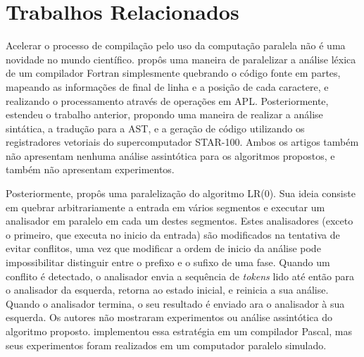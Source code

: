 
\newcommand{\sla}{\textbackslash}

\newcommand{\cmd}[1]{\textsf{#1}}

\newcommand{\pkg}[1]{\textsf{#1}}

\newcommand{\ltxcmd}[1]{\cmd{\sla{}#1}}

\chapter{Trabalhos Relacionados}
\label{chap:related_works}

Acelerar o processo de compilação pelo uso da computação paralela não é
uma novidade no mundo científico. \cite{Lincoln:1970:PPT:987475.987478}
propôs uma maneira de paralelizar a análise léxica de um compilador
Fortran simplesmente quebrando o código fonte em partes, mapeando as 
informações de final de
linha e a posição de cada caractere, e realizando o processamento
através de operações em APL.
Posteriormente, \cite{Krohn:1975:PAC:390015.808414} estendeu o trabalho
anterior, propondo uma maneira de realizar a análise sintática, a 
tradução para a AST, e a geração
de código utilizando os registradores vetoriais do supercomputador
STAR-100. Ambos os artigos também não apresentam nenhuma
análise assintótica para os algoritmos propostos, e também não apresentam
experimentos. 

Posteriormente, \cite{Mickunas:1978:PCM:800127.804105} propôs uma
paralelização do algoritmo LR($0$). Sua ideia consiste em quebrar
arbitrariamente a entrada em vários segmentos e executar um analisador em paralelo
em cada um destes segmentos. Estes analisadores (exceto o primeiro,
que executa no inicio da entrada) são modificados na tentativa de
evitar conflitos, uma vez que modificar a ordem de inicio da análise
pode impossibilitar distinguir entre o prefixo e o sufixo de uma fase.
Quando um conflito é detectado, o analisador envia a sequência de
\textit{tokens} lido até então para o analisador da esquerda,
retorna ao estado inicial, e reinicia a sua análise.
Quando o analisador termina, o seu resultado é enviado
ara o analisador à sua esquerda. Os autores não mostraram experimentos ou
análise assintótica do algoritmo proposto. \cite{Pennello:1978:FMA:512760.512786}
implementou essa estratégia em um compilador Pascal, mas seus experimentos foram
realizados em um computador paralelo simulado.

